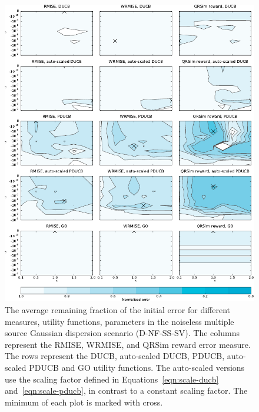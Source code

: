 \begin{figure}
    \centering
    \includegraphics{plots/psearch-D-NF-MS-SV}
    \caption[Remaining fraction of the initial error (D-NF-MS-SV)]{The average 
        remaining fraction of the initial error for different measures, utility 
        functions, parameters in the noiseless multiple source Gaussian 
        dispersion scenario (D-NF-SS-SV).  The columns represent the RMISE, 
        WRMISE, and QRSim reward error measure.  The rows represent the DUCB, 
        auto-scaled DUCB, PDUCB, auto-scaled PDUCB and GO utility functions. The 
        auto-scaled versions use the scaling factor defined in 
        Equations~\ref{eqn:scale-ducb} and~\ref{eqn:scale-pducb}, in contrast to 
        a constant scaling factor.  The minimum of each plot is marked with 
        cross.}\label{fig:psearch-D-NF-MS-SV}
\end{figure}

\newenvironment{errtbl}{\begin{tabular}{lllSSSS}\toprule}{\bottomrule\end{tabular}}
\newcommand*{\errtblhead}[1]{
        & & &
        \multicolumn{2}{c}{#1} &
        \multicolumn{2}{c}{Norm.\ #1} \\
        \cmidrule(lr){4-5} \cmidrule(lr){6-7}

        Utility function &
        \multicolumn{1}{l}{$\kappa$} &
        \multicolumn{1}{l}{$\gamma$} &
        \multicolumn{1}{c}{Mean} &
        \multicolumn{1}{c}{Std} &
        \multicolumn{1}{c}{Mean} &
        \multicolumn{1}{c}{Std} \\
        & & &
        \multicolumn{1}{c}{\si{\nano\gram\per\meter\cubed}} &
        \multicolumn{1}{c}{\si{\nano\gram\per\meter\cubed}} &
        & \\ \midrule }

